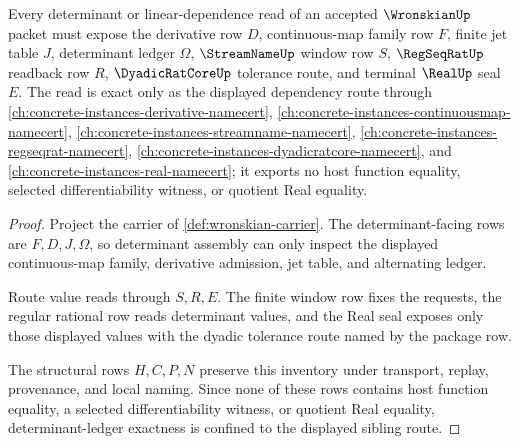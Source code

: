 \begin{theorem}
\label{thm:wronskian-determinant-ledger-exactness}
Every determinant or linear-dependence read of an accepted $\WronskianUp$ packet must expose the derivative row $D$, continuous-map family row $F$, finite jet table $J$, determinant ledger $\Omega$, $\StreamNameUp$ window row $S$, $\RegSeqRatUp$ readback row $R$, $\DyadicRatCoreUp$ tolerance route, and terminal $\RealUp$ seal $E$. The read is exact only as the displayed dependency route through \autoref{ch:concrete-instances-derivative-namecert}, \autoref{ch:concrete-instances-continuousmap-namecert}, \autoref{ch:concrete-instances-streamname-namecert}, \autoref{ch:concrete-instances-regseqrat-namecert}, \autoref{ch:concrete-instances-dyadicratcore-namecert}, and \autoref{ch:concrete-instances-real-namecert}; it exports no host function equality, selected differentiability witness, or quotient Real equality.
\end{theorem}
\begin{proof}
Project the carrier of \autoref{def:wronskian-carrier}. The determinant-facing rows are $F,D,J,\Omega$, so determinant assembly can only inspect the displayed continuous-map family, derivative admission, jet table, and alternating ledger.

Route value reads through $S,R,E$. The finite window row fixes the requests, the regular rational row reads determinant values, and the Real seal exposes only those displayed values with the dyadic tolerance route named by the package row.

The structural rows $H,C,P,N$ preserve this inventory under transport, replay, provenance, and local naming. Since none of these rows contains host function equality, a selected differentiability witness, or quotient Real equality, determinant-ledger exactness is confined to the displayed sibling route.
\end{proof}

